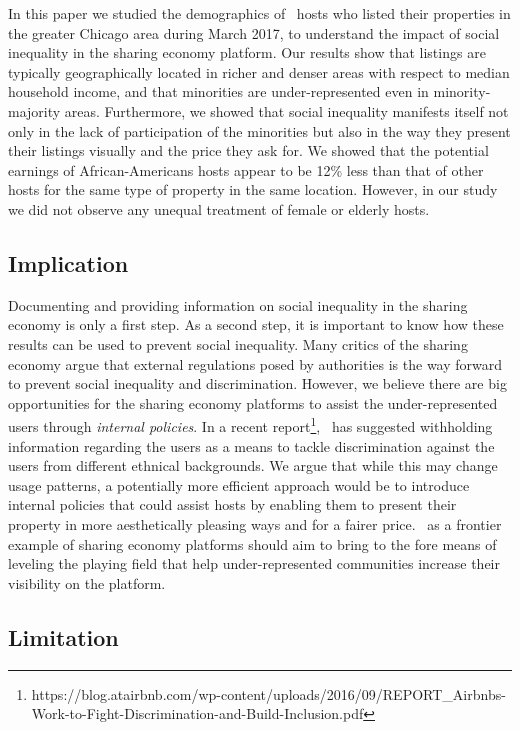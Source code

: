 In this paper we studied the demographics of  \ab \  hosts who listed their properties in the greater Chicago area during March 2017, to understand the impact of  social inequality in the sharing economy platform.  Our results show that listings are typically geographically located in richer and denser areas with respect to median household income, and that minorities are under-represented even in minority-majority areas. Furthermore, we showed that social inequality  manifests itself not only in the lack  of participation of the minorities but also in the way they present their listings visually and the price they ask for.  We showed that  the potential earnings of  African-Americans hosts appear to be 12\% less than that of other hosts for the same type of property in the same location.  However, in our study we did not observe any  unequal treatment of female or elderly hosts.  

\subsection{Implication}  



Documenting and providing information on social inequality  in the sharing economy is only a first step.  As a second step, it is important to know 
how these results can be used to prevent social inequality. Many critics of the sharing economy argue that external regulations posed by authorities is the way forward to prevent social inequality and discrimination. However, we believe there are big opportunities for the sharing economy platforms to assist the under-represented users through \emph{internal policies}.  In a  recent report\footnote{https://blog.atairbnb.com/wp-content/uploads/2016/09/REPORT\_Airbnbs-Work-to-Fight-Discrimination-and-Build-Inclusion.pdf},  \ab \  has suggested withholding information regarding the users as  a means to tackle discrimination against the users from different ethnical backgrounds.  We argue that while this may change usage patterns, 
a potentially  more efficient approach would be to introduce internal policies that could assist hosts by enabling them to present their property in more aesthetically pleasing ways and for a fairer price. \ab \ as a frontier example of sharing economy platforms should aim to bring to the fore  means of leveling the playing field that help under-represented communities increase their visibility on the platform.


\subsection{Limitation}

